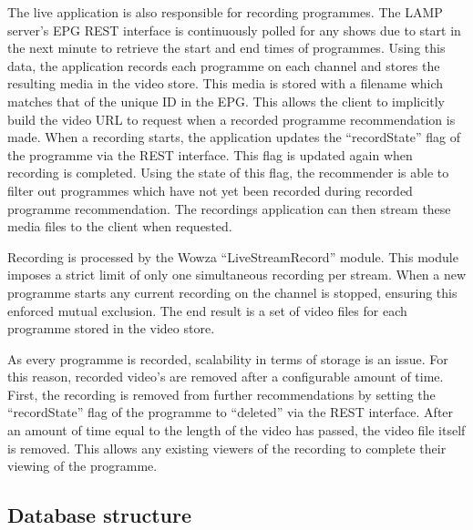 The live application is also responsible for recording programmes. The LAMP server's EPG REST interface is continuously polled for any shows due to start in the next minute to retrieve the start and end times of programmes. Using this data, the application records each programme on each channel and stores the resulting media in the video store. This media is stored with a filename which matches that of the unique ID in the EPG. This allows the client to implicitly build the video URL to request when a recorded programme recommendation is made. When a recording starts, the application updates the ``recordState'' flag of the programme via the REST interface. This flag is updated again when recording is completed. Using the state of this flag, the recommender is able to filter out programmes which have not yet been recorded during recorded programme recommendation. The recordings application can then stream these media files to the client when requested.

Recording is processed by the Wowza ``LiveStreamRecord'' module. This module imposes a strict limit of only one simultaneous recording per stream. When a new programme starts any current recording on the channel is stopped, ensuring this enforced mutual exclusion. The end result is a set of video files for each programme stored in the video store.

As every programme is recorded, scalability in terms of storage is an issue. For this reason, recorded video's are removed after a configurable amount of time. First, the recording is removed from further recommendations by setting the ``recordState'' flag of the programme to ``deleted'' via the REST interface. After an amount of time equal to the length of the video has passed, the video file itself is removed. This allows any existing viewers of the recording to complete their viewing of the programme.

\subsection{Database structure}

